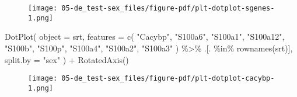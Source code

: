 \documentclass[
  letterpaper,
  DIV=11,
  numbers=noendperiod]{scrartcl}
\newenvironment{Shaded}{\begin{snugshade}}{\end{snugshade}}
\newcommand{\AttributeTok}[1]{\textcolor[rgb]{0.40,0.45,0.13}{#1}}
\newcommand{\ConstantTok}[1]{\textcolor[rgb]{0.56,0.35,0.01}{#1}}
\newcommand{\DecValTok}[1]{\textcolor[rgb]{0.68,0.00,0.00}{#1}}
\newcommand{\FloatTok}[1]{\textcolor[rgb]{0.68,0.00,0.00}{#1}}
\newcommand{\FunctionTok}[1]{\textcolor[rgb]{0.28,0.35,0.67}{#1}}
\newcommand{\NormalTok}[1]{\textcolor[rgb]{0.00,0.23,0.31}{#1}}
\newcommand{\SpecialCharTok}[1]{\textcolor[rgb]{0.37,0.37,0.37}{#1}}
\newcommand{\StringTok}[1]{\textcolor[rgb]{0.13,0.47,0.30}{#1}}
\begin{document}
\begin{figure}[H]

{\centering \texttt{[image: 05-de\_test-sex\_files/figure-pdf/plt-dotplot-sgenes-1.png]}

}

\end{figure}

\begin{Shaded}
\begin{Highlighting}[]
\FunctionTok{DotPlot}\NormalTok{(}
  \AttributeTok{object =}\NormalTok{ srt,}
  \AttributeTok{features =} \FunctionTok{c}\NormalTok{(}
    \StringTok{"Cacybp"}\NormalTok{, }\StringTok{"S100a6"}\NormalTok{, }\StringTok{"S100a1"}\NormalTok{,}
    \StringTok{"S100a12"}\NormalTok{, }\StringTok{"S100b"}\NormalTok{, }\StringTok{"S100p"}\NormalTok{,}
    \StringTok{"S100a4"}\NormalTok{, }\StringTok{"S100a2"}\NormalTok{, }\StringTok{"S100a3"}
\NormalTok{  ) }\SpecialCharTok{\%\textgreater{}\%}
\NormalTok{    .[. }\SpecialCharTok{\%in\%} \FunctionTok{rownames}\NormalTok{(srt)],}
  \AttributeTok{split.by =} \StringTok{"sex"}
\NormalTok{) }\SpecialCharTok{+} \FunctionTok{RotatedAxis}\NormalTok{()}
\end{Highlighting}
\end{Shaded}

\begin{figure}[H]

{\centering \texttt{[image: 05-de\_test-sex\_files/figure-pdf/plt-dotplot-cacybp-1.png]}

}

\end{figure}

\begin{Shaded}
\end{Shaded}
\end{document}
